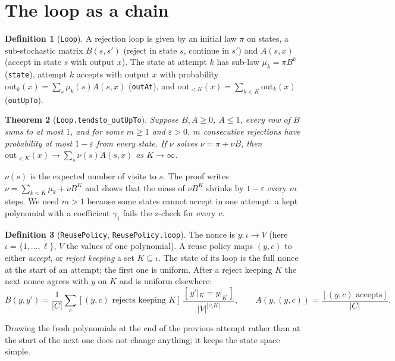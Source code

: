 \documentclass[11pt]{article}
\newtheorem{theorem}{Theorem}
\theoremstyle{definition}
\newtheorem{definition}[theorem]{Definition}
\theoremstyle{remark}
\newcommand{\lean}[1]{\texttt{#1}}
\begin{document}
\section{The loop as a chain}\label{sec:loop}

\begin{definition}[\lean{Loop}]
A rejection loop is given by an initial law $\pi$ on states, a sub-stochastic matrix
$B(s,s')$ (reject in state $s$, continue in $s'$) and $A(s,x)$ (accept in state $s$ with output
$x$). The state at attempt $k$ has sub-law $\mu_k = \pi B^k$ (\lean{state}), attempt $k$ accepts
with output $x$ with probability $\mathrm{out}_k(x) = \sum_s \mu_k(s) A(s,x)$ (\lean{outAt}), and
$\mathrm{out}_{<K}(x) = \sum_{k<K} \mathrm{out}_k(x)$ (\lean{outUpTo}).
\end{definition}

\begin{theorem}[\lean{Loop.tendsto\_outUpTo}]
Suppose $B, A \ge 0$, $A \le 1$, every row of $B$ sums to at most $1$, and for some $m \ge 1$ and
$\varepsilon > 0$, $m$ consecutive rejections have probability at most $1-\varepsilon$ from every
state. If $\nu$ solves $\nu = \pi + \nu B$, then
$\mathrm{out}_{<K}(x) \to \sum_s \nu(s) A(s,x)$ as $K\to\infty$.
\end{theorem}

$\nu(s)$ is the expected number of visits to $s$. The proof writes
$\nu = \sum_{k<K}\mu_k + \nu B^K$ and shows that the mass of $\nu B^K$ shrinks by $1-\varepsilon$
every $m$ steps. We need $m>1$ because some states cannot accept in one attempt: a kept
polynomial with a coefficient $\gamma_1$ fails the z-check for every $c$.

\begin{definition}[\lean{ReusePolicy}, \lean{ReusePolicy.loop}]
The nonce is $y : \iota \to V$ (here $\iota = \{1,\dots,\ell\}$, $V$ the values of one
polynomial). A reuse policy maps $(y,c)$ to either \emph{accept}, or \emph{reject keeping}
a set $K\subseteq\iota$. The state of its loop is the full nonce at the start of an attempt; the
first one is uniform. After a reject keeping $K$ the next nonce agrees with $y$ on $K$ and is
uniform elsewhere:
\[
  B(y,y') = \frac1{|C|}\sum_{c} [\text{$(y,c)$ rejects keeping $K$}]\,
    \frac{[\,y'|_K = y|_K\,]}{|V|^{|\iota\setminus K|}},\qquad
  A(y,(y,c)) = \frac{[\text{$(y,c)$ accepts}]}{|C|}.
\]
\end{definition}
Drawing the fresh polynomials at the end of the previous attempt rather than at the start of the
next one does not change anything; it keeps the state space simple.
\end{document}
